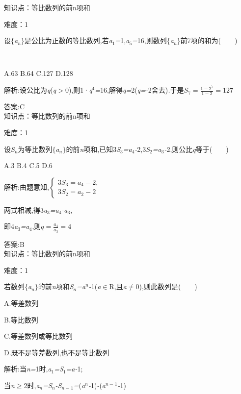 \documentclass{article} %
\begin{document}
知识点：等比数列的前n项和

难度：1

 设$\mathrm{\{}$\textit{a${}_{n}$}$\mathrm{\}}$是公比为正数的等比数列,若\textit{a}${}_{1}$\textit{=}1,\textit{a}${}_{5}$\textit{=}16,则数列$\mathrm{\{}$\textit{a${}_{n}$}$\mathrm{\}}$前7项的和为(\textit{　　})

 \textit{　　　　　　　　　　　　　　　　}

 A.63 B.64 C.127 D.128

 解析:设公比为\textit{q}(\textit{q$>$}0),则1·\textit{q}${}^{4}$\textit{=}16,解得\textit{q=}2(\textit{q=-}2舍去)\textit{.}于是$S_7=\frac{1-2^7}{1-2}=127$

 答案:C \\

知识点：等比数列的前n项和

难度：1

 设\textit{S${}_{n}$}为等比数列$\mathrm{\{}$\textit{a${}_{n}$}$\mathrm{\}}$的前\textit{n}项和,已知3\textit{S}${}_{3}$\textit{=a}${}_{4}$\textit{-}2,3\textit{S}${}_{2}$\textit{=a}${}_{3}$\textit{-}2,则公比\textit{q}等于(\textit{　　})

 A.3 B.4 C.5 D.6

 解析:由题意知,$\left\{
\begin{array}{l}
3S_3=a_4-2, \\
3S_2=a_2-2
\end{array}
\right.$

两式相减,得3\textit{a}${}_{3}$\textit{=a}${}_{4}$\textit{-a}${}_{3}$,

即4\textit{a}${}_{3}$\textit{=a}${}_{4}$,则$q=\frac{a_4}{a_3}=4$

 答案:B \\

知识点：等比数列的前n项和

难度：1

 若数列$\mathrm{\{}$\textit{a${}_{n}$}$\mathrm{\}}$的前\textit{n}项和\textit{S${}_{n}$=a${}^{n}$-}1(\textit{a}$\mathrm{\in}$R,且\textit{a}$\mathrm{\neq}$0),则此数列是(\textit{　　})

 A.等差数列

 B.等比数列

 C.等差数列或等比数列

 D.既不是等差数列,也不是等比数列

 解析:当\textit{n=}1时,\textit{a}${}_{1}$\textit{=S}${}_{1}$\textit{=a-}1;

当\textit{n}$\mathrm{\ge}$2时,\textit{a${}_{n}$=S${}_{n}$-S${}_{n-}$}${}_{1}$\textit{=}(\textit{a${}^{n}$-}1)\textit{-}(\textit{a${}^{n-}$}${}^{1}$\textit{-}1)
\end{document}
